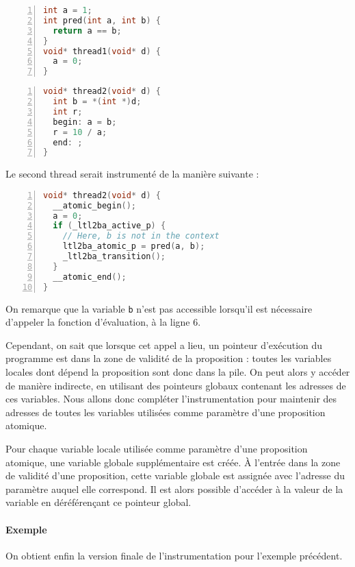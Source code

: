 \noindent\begin{minipage}{.45\textwidth}
\begin{lstlisting}[language=C, frame=single, numbers=left, caption=Thread 1]
int a = 1;
int pred(int a, int b) {
  return a == b;
}
void* thread1(void* d) {
  a = 0;
}
\end{lstlisting}
\end{minipage}\hfill
\begin{minipage}{.45\textwidth}
\begin{lstlisting}[language=C, frame=single, numbers=left, caption=Thread 2]
void* thread2(void* d) {
  int b = *(int *)d;
  int r;
  begin: a = b;
  r = 10 / a;
  end: ;
}
\end{lstlisting}
\end{minipage}

Le second thread serait instrumenté de la manière suivante :

\begin{lstlisting}[language=C, frame=single, numbers=left,
  caption=Thread 2 instrumenté]
void* thread2(void* d) {
  __atomic_begin();
  a = 0;
  if (_ltl2ba_active_p) {
    // Here, b is not in the context
    ltl2ba_atomic_p = pred(a, b);
    _ltl2ba_transition();
  }
  __atomic_end();
}
\end{lstlisting}

On remarque que la variable \texttt{b} n'est pas accessible lorsqu'il
est nécessaire d'appeler la fonction d'évaluation, à la ligne 6.

Cependant, on sait que lorsque cet appel a lieu, un pointeur d'exécution
du programme est dans la zone de validité de la proposition : toutes les
variables locales dont dépend la proposition sont donc dans la pile. On
peut alors y accéder de manière indirecte, en utilisant des pointeurs
globaux contenant les adresses de ces variables. Nous allons donc
compléter l'instrumentation pour maintenir des adresses de toutes les
variables utilisées comme paramètre d'une proposition atomique.

Pour chaque variable locale utilisée comme paramètre d'une proposition
atomique, une variable globale supplémentaire est créée. À l'entrée dans
la zone de validité d'une proposition, cette variable globale est
assignée avec l'adresse du paramètre auquel elle correspond. Il est
alors possible d'accéder à la valeur de la variable en déréférençant ce
pointeur global.

\paragraph{Exemple}
On obtient enfin la version finale de l'instrumentation pour l'exemple
précédent.

